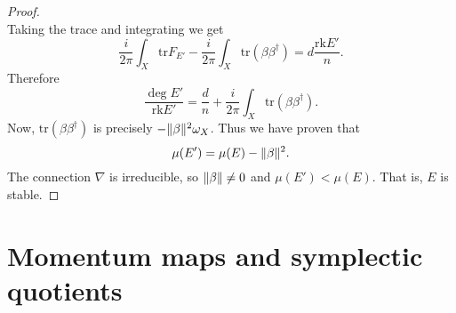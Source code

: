 \documentclass[12pt,a4paper]{book}
\theoremstyle{definition} \newtheorem{defn}[thm]{Definition}
\theoremstyle{definition} \newtheorem{ejemplo}[thm]{Example}
\theoremstyle{remark} \newtheorem{rem}[thm]{Remark}
\def\tr{\mathrm{tr}}
\def\rk{\mathrm{rk}}
\DeclarePairedDelimiter\norm{\lVert}{\rVert}
\begin{document}
\begin{proof}
\begin{equation*}
\end{equation*}
Taking the trace and integrating we get
\begin{equation*}
  \frac{i}{2\pi}\int_X \tr F_{E'} - \frac{i}{2\pi} \int_X \tr(\beta \beta^\dagger) = d\frac{\rk E'}{n}.
\end{equation*}
Therefore
\begin{equation*}
  \frac{\deg E'}{ \rk E'} = \frac{d}{n} + \frac{i}{2\pi} \int_X \tr(\beta \beta^\dagger).
\end{equation*}
Now, $\tr(\beta\beta^\dagger)$ is precisely $- \norm{\beta}^2 \omega_X$. Thus we have proven that 
\begin{equation*}
\mu(E')= \mu(E) - \norm{\beta}^2 .
\end{equation*}
The connection $\nabla$ is irreducible, so $\norm{\beta}\neq 0$ and $\mu(E')< \mu(E)$. That is, $E$ is stable.
\end{proof}

\chapter{Momentum maps and symplectic quotients}
\end{document}
